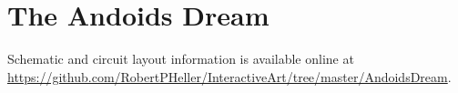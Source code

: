 %
%
%
%
% 
%
%
%
%
%
% 
%

\section{The Andoids Dream}

Schematic and circuit layout information is available online at 
\url{https://github.com/RobertPHeller/InteractiveArt/tree/master/AndoidsDream}.
